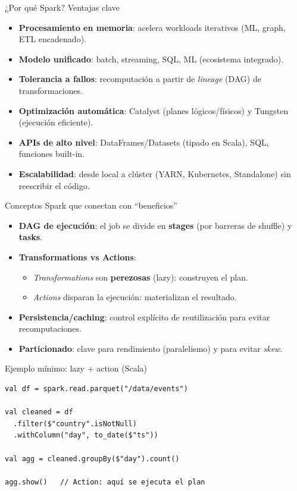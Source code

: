 \documentclass{beamer}
\begin{document}
\begin{frame}{¿Por qué Spark? Ventajas clave}
\begin{itemize}
  \item \textbf{Procesamiento en memoria}: acelera workloads iterativos (ML, graph, ETL encadenado).
  \item \textbf{Modelo unificado}: batch, streaming, SQL, ML (ecosistema integrado).
  \item \textbf{Tolerancia a fallos}: recomputación a partir de \emph{lineage} (DAG) de transformaciones.
  \item \textbf{Optimización automática}: Catalyst (planes lógicos/físicos) y Tungsten (ejecución eficiente).
  \item \textbf{APIs de alto nivel}: DataFrames/Datasets (tipado en Scala), SQL, funciones built-in.
  \item \textbf{Escalabilidad}: desde local a clúster (YARN, Kubernetes, Standalone) sin reescribir el código.
\end{itemize}
\end{frame}

\begin{frame}{Conceptos Spark que conectan con “beneficios”}
\begin{itemize}
  \item \textbf{DAG de ejecución}: el job se divide en \textbf{stages} (por barreras de shuffle) y \textbf{tasks}.
  \item \textbf{Transformations vs Actions}:
  \begin{itemize}
    \item \emph{Transformations} son \textbf{perezosas} (lazy): construyen el plan.
    \item \emph{Actions} disparan la ejecución: materializan el resultado.
  \end{itemize}
  \item \textbf{Persistencia/caching}: control explícito de reutilización para evitar recomputaciones.
  \item \textbf{Particionado}: clave para rendimiento (paralelismo) y para evitar \emph{skew}.
\end{itemize}
\end{frame}

\begin{frame}[fragile]{Ejemplo mínimo: lazy + action (Scala)}
\begin{verbatim}
val df = spark.read.parquet("/data/events")

val cleaned = df
  .filter($"country".isNotNull)
  .withColumn("day", to_date($"ts"))

val agg = cleaned.groupBy($"day").count()

agg.show()   // Action: aquí se ejecuta el plan
\end{verbatim}
\end{frame}
\end{document}

